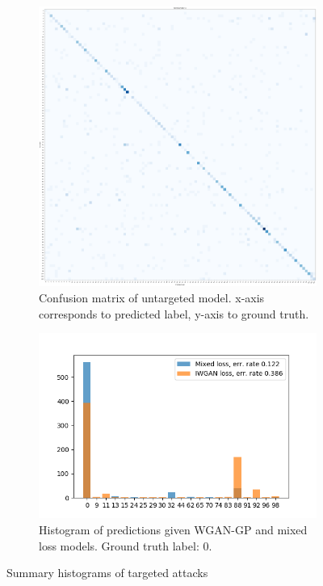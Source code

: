 \begin{figure}[!t]
    \centering
    \begin{subfigure}[b]{0.4\columnwidth}
        \centering
        \includegraphics[width=\columnwidth]{figures/conf_mat_cnn_knn.png}
        \caption{Confusion matrix of untargeted model. x-axis corresponds to predicted label, y-axis to ground truth.}
        \label{fig:conf_mat_untargeted}
    \end{subfigure}  
    \qquad
    \begin{subfigure}[b]{0.5\columnwidth}
        \centering
        \includegraphics[width=\columnwidth]{figures/pred_comparisson_spk0.png}
        \caption{Histogram of predictions given WGAN-GP and mixed loss models. Ground truth label: 0.}
        \label{fig:pred_comp_spk0}
    \end{subfigure}
    \caption{Summary histograms of targeted attacks}
    \label{fig:confusion_matrices}
\end{figure}
